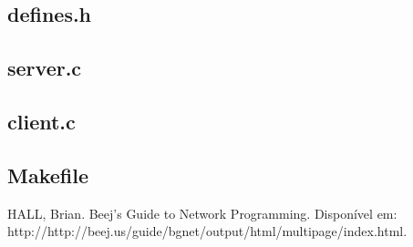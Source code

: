 \documentclass[11pt,twoside]{article}
\begin{document}
\subsection{defines.h}      %
\subsection{server.c}       %
\subsection{client.c}       %
\subsection{Makefile}       %

\begin{thebibliography}{99}
 HALL, Brian. Beej's Guide to Network Programming. Disponível em: http://http://beej.us/guide/bgnet/output/html/multipage/index.html.
\end{thebibliography}
\end{document}
